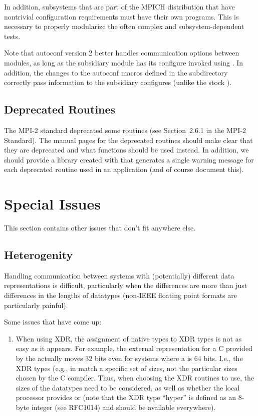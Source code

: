 \documentclass{article}
\begin{document}
In addition, subsystems that are part of the MPICH distribution that have
nontrivial configuration requirements must have their own 
programs.  This is necessary to properly modularize the often complex and
subsystem-dependent tests.

Note that autoconf version 2 better handles communication options between
modules, as long as the subsidiary module has its configure invoked using
.  In addition, the changes to the autoconf
macros defined in the  subdirectory correctly pass
information to the subsidiary configures (unlike the stock
).

\subsection{Deprecated Routines}

The MPI-2 standard deprecated some routines (see Section~2.6.1 in the MPI-2
Standard).  The manual pages for the deprecated routines should make clear
that they are deprecated and what functions should be used instead.  In
addition, we should provide a library created with  that
generates a single warning message for each deprecated routine used in an
application (and of course document this).


%

\section{Special Issues}
This section contains other issues that don't fit anywhere else.

\label{sec:special-issues}

\subsection{Heterogenity}
\label{sec:hetero-issues}

Handling communication between systems with (potentially) different data
representations is difficult, particularly when the differences are more than
just differences in the lengths of datatypes (non-IEEE floating point formats
are particularly painful).

Some issues that have come up:
\begin{enumerate}
\item When using XDR, the assignment of native types to XDR types
  is not as easy as it appears.  For example, the external representation for
  a C  provided by the  actually moves 32 bits
  even for systems where a  is 64 bits.  I.e., the XDR types (e.g.,
  in  match a specific set of sizes, not the particular sizes
  chosen by the C compiler.  Thus, when choosing the XDR routines to use, the
  sizes of the datatypes need to be considered, as well as whether the local
  processor provides  or  (note that the
  XDR type ``hyper'' is defined as an 8-byte integer (see RFC1014) and should
  be available everywhere).

\end{enumerate}
\end{document}
